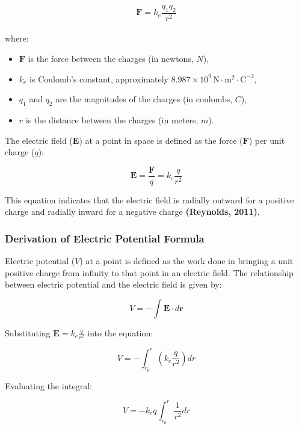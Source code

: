 \documentclass[12pt,a4paper]{report}
\begin{document}
\begin{equation}
\mathbf{F} = k_e \frac{q_1 q_2}{r^2}
\end{equation}
\\
where:
\begin{itemize}
    \item \(\mathbf{F}\) is the force between the charges (in newtons, \(N\)),
    \item \(k_e\) is Coulomb's constant, approximately \(8.987 \times 10^9 \, \mathrm{N \cdot m^2 \cdot C^{-2}}\),
    \item \(q_1\) and \(q_2\) are the magnitudes of the charges (in coulombs, \(C\)),
    \item \(r\) is the distance between the charges (in meters, \(m\)).
\end{itemize}

The electric field (\(\mathbf{E}\)) at a point in space is defined as the force (\(\mathbf{F}\)) per unit charge (\(q\)):

\begin{equation}
\mathbf{E} = \frac{\mathbf{F}}{q} = k_e \frac{q}{r^2}
\end{equation}

This equation indicates that the electric field is radially outward for a positive charge and radially inward for a negative charge \textbf{(Reynolds, 2011)}.

\subsubsection{Derivation of Electric Potential Formula}
Electric potential (\(V\)) at a point is defined as the work done in bringing a unit positive charge from infinity to that point in an electric field. The relationship between electric potential and the electric field is given by:

\begin{equation}
V = - \int \mathbf{E} \cdot d\mathbf{r}
\end{equation}

Substituting \(\mathbf{E} = k_e \frac{q}{r^2}\) into the equation:

\begin{equation}
V = - \int_{r_0}^{r} \left( k_e \frac{q}{r^2} \right) dr
\end{equation}

Evaluating the integral:

\begin{equation}
V = - k_e q \int_{r_0}^{r} \frac{1}{r^2} dr
\end{equation}
\end{document}
